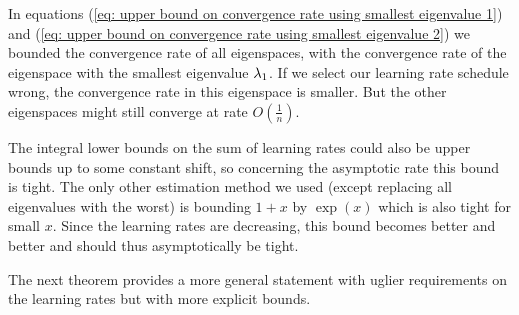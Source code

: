 \begin{remark}\label{rem: rate is retained for larger eigenvalues}
	In equations (\ref{eq: upper bound on convergence rate using smallest eigenvalue 1})
	and (\ref{eq: upper bound on convergence rate using smallest eigenvalue 2})
	we bounded the convergence rate of all eigenspaces, with the convergence rate
	of the eigenspace with the smallest eigenvalue \(\lambda_1\). If we select
	our learning rate schedule wrong, the convergence rate in this eigenspace
	is smaller. But the other eigenspaces might still converge at rate \(O(\tfrac1n)\).
\end{remark}
\begin{remark}
	The integral lower bounds on the sum of learning rates could also be upper bounds
	up to some constant shift, so concerning the asymptotic rate this bound is
	tight. The only other estimation method we used (except replacing all
	eigenvalues with the worst) is bounding \(1+x\) by \(\exp(x)\) which is
	also tight for small \(x\). Since the learning rates are decreasing, this
	bound becomes better and better and should thus asymptotically be tight.
\end{remark}

The next theorem provides a more general statement with uglier requirements on
the learning rates but with more explicit bounds.

